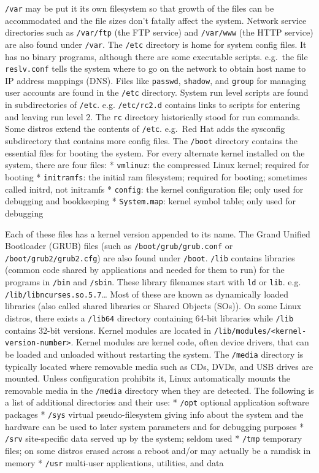 \texttt{/var} may be put it its own filesystem so that growth of the
files can be accommodated and the file sizes don't fatally affect the
system. Network service directories such as \texttt{/var/ftp} (the FTP
service) and \texttt{/var/www} (the HTTP service) are also found under
\texttt{/var}. The \texttt{/etc} directory is home for system config
files. It has no binary programs, although there are some executable
scripts. e.g.~the file \texttt{reslv.conf} tells the system where to go
on the network to obtain host name to IP address mappings (DNS). Files
like \texttt{passwd}, \texttt{shadow}, and \texttt{group} for managing
user accounts are found in the \texttt{/etc} directory. System run level
scripts are found in subdirectories of \texttt{/etc}. e.g.
\texttt{/etc/rc2.d} contains links to scripts for entering and leaving
run level 2. The \texttt{rc} directory historically stood for run
commands. Some distros extend the contents of \texttt{/etc}. e.g.~Red
Hat adds the sysconfig subdirectory that contains more config files. The
\texttt{/boot} directory contains the essential files for booting the
system. For every alternate kernel installed on the system, there are
four files: * \texttt{vmlinuz}: the compressed Linux kernel; required
for booting * \texttt{initramfs}: the initial ram filesystem; required
for booting; sometimes called initrd, not initramfs * \texttt{config}:
the kernel configuration file; only used for debugging and bookkeeping *
\texttt{System.map}: kernel symbol table; only used for debugging

Each of these files has a kernel version appended to its name. The Grand
Unified Bootloader (GRUB) files (such as \texttt{/boot/grub/grub.conf}
or \texttt{/boot/grub2/grub2.cfg}) are also found under \texttt{/boot}.
\texttt{/lib} contains libraries (common code shared by applications and
needed for them to run) for the programs in \texttt{/bin} and
\texttt{/sbin}. These library filenames start with \texttt{ld} or
\texttt{lib}. e.g. \texttt{/lib/libncurses.so.5.7}\ldots{} Most of these
are known as dynamically loaded libraries (also called shared libraries
or Shared Objects (SOs)). On some Linux distros, there exists a
\texttt{/lib64} directory containing 64-bit libraries while
\texttt{/lib} contains 32-bit versions. Kernel modules are located in
\texttt{/lib/modules/\textless{}kernel-version-number\textgreater{}}.
Kernel modules are kernel code, often device drivers, that can be loaded
and unloaded without restarting the system. The \texttt{/media}
directory is typically located where removable media such as CDs, DVDs,
and USB drives are mounted. Unless configuration prohibits it, Linux
automatically mounts the removable media in the \texttt{/media}
directory when they are detected. The following is a list of additional
directories and their use: * \texttt{/opt} optional application software
packages * \texttt{/sys} virtual pseudo-filesystem giving info about the
system and the hardware can be used to later system parameters and for
debugging purposes * \texttt{/srv} site-specific data served up by the
system; seldom used * \texttt{/tmp} temporary files; on some distros
erased across a reboot and/or may actually be a ramdisk in memory *
\texttt{/usr} multi-user applications, utilities, and data

